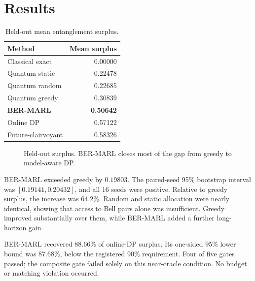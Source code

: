 \documentclass[10pt,twocolumn]{article}
\newcommand{\method}{\textsc{BER-MARL}}
\begin{document}
\section{Results}
\begin{table}[t]
\centering
\caption{Held-out mean entanglement surplus.}
\label{tab:results}
\small
\begin{tabular}{@{}lr@{}}
\toprule
Method & Mean surplus \\
\midrule
Classical exact & 0.00000 \\
Quantum static & 0.22478 \\
Quantum random & 0.22685 \\
Quantum greedy & 0.30839 \\
\textbf{BER-MARL} & \textbf{0.50642} \\
Online DP & 0.57122 \\
Future-clairvoyant & 0.58326 \\
\bottomrule
\end{tabular}
\end{table}

\begin{figure}[t]
\centering
{}
\caption{Held-out surplus. \method{} closes most of the gap from greedy to model-aware DP.}
\label{fig:results}
\end{figure}

\method{} exceeded greedy by $0.19803$. The paired-seed 95\% bootstrap interval was $[0.19141,0.20432]$, and all 16 seeds were positive. Relative to greedy surplus, the increase was 64.2\%. Random and static allocation were nearly identical, showing that access to Bell pairs alone was insufficient. Greedy improved substantially over them, while \method{} added a further long-horizon gain.

\method{} recovered 88.66\% of online-DP surplus. Its one-sided 95\% lower bound was 87.68\%, below the registered 90\% requirement. Four of five gates passed; the composite gate failed solely on this near-oracle condition. No budget or matching violation occurred.
\end{document}
